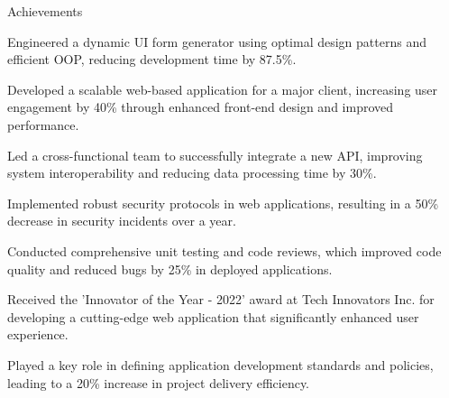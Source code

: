 \documentclass{resume} %
\begin{document}
    \begin{rSection}{Achievements}
        \begin{rSubsection}{}{}{}
                            \item Engineered a dynamic UI form generator using optimal design patterns and efficient OOP, reducing development time by 87.5\%.
                            \item Developed a scalable web{-}based application for a major client, increasing user engagement by 40\% through enhanced front{-}end design and improved performance.
                            \item Led a cross{-}functional team to successfully integrate a new API, improving system interoperability and reducing data processing time by 30\%.
                            \item Implemented robust security protocols in web applications, resulting in a 50\% decrease in security incidents over a year.
                            \item Conducted comprehensive unit testing and code reviews, which improved code quality and reduced bugs by 25\% in deployed applications.
                            \item Received the 'Innovator of the Year {-} 2022' award at Tech Innovators Inc. for developing a cutting{-}edge web application that significantly enhanced user experience.
                            \item Played a key role in defining application development standards and policies, leading to a 20\% increase in project delivery efficiency.
                    \end{rSubsection}
    \end{rSection}
\end{document}
